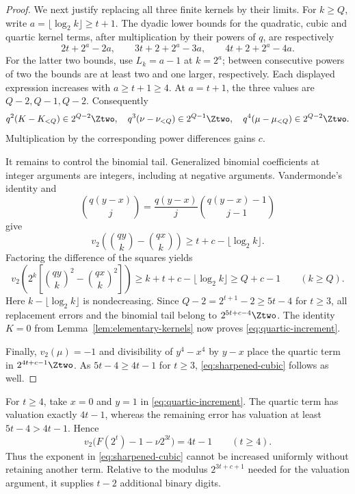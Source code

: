 \begin{proof}
We next justify replacing all three finite kernels by their limits.
For $k\ge Q$, write $a=\lfloor\log_2k\rfloor\ge t+1$.
The dyadic lower bounds for the quadratic, cubic and quartic
kernel terms, after multiplication by their powers of $q$, are
respectively
\[
 2t+2^a-2a,\qquad
 3t+2+2^a-3a,\qquad
 4t+2+2^a-4a.
\]
For the latter two bounds, use $L_k=a-1$ at $k=2^a$;
between consecutive powers of two the bounds are at least two and
one larger, respectively. Each displayed expression increases with
$a\ge t+1\ge4$. At $a=t+1$, the three values are $Q-2,Q-1,Q-2$.
Consequently
\[
 q^2(K-K_{<Q})\in2^{Q-2}\Ztwo,\quad
 q^3(\nu-\nu_{<Q})\in2^{Q-1}\Ztwo,\quad
 q^4(\mu-\mu_{<Q})\in2^{Q-2}\Ztwo.
\]
Multiplication by the corresponding power differences gains $c$.

It remains to control the binomial tail. Generalized binomial
coefficients at integer arguments are integers, including at negative
arguments. Vandermonde's identity and
\[
 \binom{q(y-x)}j=\frac{q(y-x)}j\binom{q(y-x)-1}{j-1}
\]
give
\[
 v_2\!\left(\binom{qy}{k}-\binom{qx}{k}\right)
 \ge t+c-\lfloor\log_2k\rfloor.
\]
Factoring the difference of the squares yields
\[
 v_2\!\left(2^k\left[\binom{qy}{k}^2-\binom{qx}{k}^2\right]\right)
 \ge k+t+c-\lfloor\log_2k\rfloor
 \ge Q+c-1\qquad(k\ge Q).
\]
Here $k-\lfloor\log_2k\rfloor$ is nondecreasing.
Since $Q-2=2^{t+1}-2\ge5t-4$ for $t\ge3$, all replacement errors
and the binomial tail belong to $2^{5t+c-4}\Ztwo$.
The identity $K=0$ from Lemma~\ref{lem:elementary-kernels}
now proves \eqref{eq:quartic-increment}.

Finally, $v_2(\mu)=-1$ and divisibility of $y^4-x^4$ by $y-x$
place the quartic term in $2^{4t+c-1}\Ztwo$.
As $5t-4\ge4t-1$ for $t\ge3$,
\eqref{eq:sharpened-cubic} follows as well.
\end{proof}

\begin{remark}\label{rem:cubic-sharpness}
For $t\ge4$, take $x=0$ and $y=1$ in
\eqref{eq:quartic-increment}. The quartic term has valuation exactly
$4t-1$, whereas the remaining error has valuation at least
$5t-4>4t-1$. Hence
\[
 v_2\bigl(F(2^t)-1-\nu2^{3t}\bigr)=4t-1\qquad(t\ge4).
\]
Thus the exponent in \eqref{eq:sharpened-cubic} cannot be increased
uniformly without retaining another term. Relative to the modulus
$2^{3t+c+1}$ needed for the valuation argument, it supplies
$t-2$ additional binary digits.
\end{remark}
